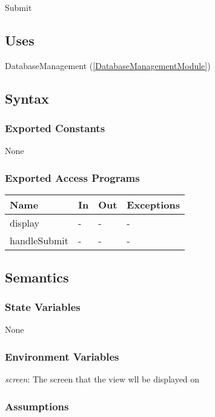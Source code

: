 \documentclass[12pt, titlepage]{article}
\begin{document}
Submit

\subsection{Uses}

DatabaseManagement (\ref{DatabaseManagementModule})

\subsection{Syntax}

\subsubsection{Exported Constants}

None

\subsubsection{Exported Access Programs}

\begin{center}
\begin{tabular}{p{2cm} p{4cm} p{4cm} p{2cm}}
\hline
\textbf{Name} & \textbf{In} & \textbf{Out} & \textbf{Exceptions} \\
\hline
display & - & - & - \\
handleSubmit & - & - & - \\
\hline
\end{tabular}
\end{center}

\subsection{Semantics}

\subsubsection{State Variables}

None

\subsubsection{Environment Variables}

\textit{screen}: The screen that the view wll be displayed on

\subsubsection{Assumptions}
\end{document}
